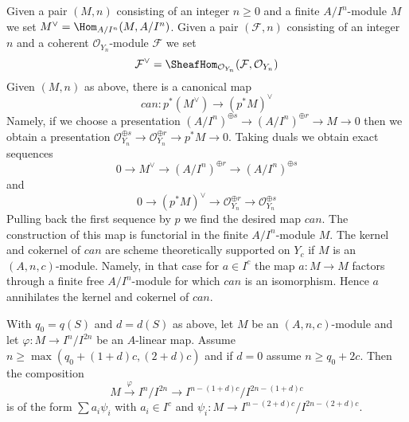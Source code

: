 \begin{remark}
\label{remark-duals}
Given a pair $(M, n)$ consisting of an integer $n \geq 0$
and a finite $A/I^n$-module $M$ we set $M^\vee = \Hom_{A/I^n}(M, A/I^n)$.
Given a pair $(\mathcal{F}, n)$ consisting of an integer $n$ and
a coherent $\mathcal{O}_{Y_n}$-module $\mathcal{F}$ we set
$$
\mathcal{F}^\vee =
\SheafHom_{\mathcal{O}_{Y_n}}(\mathcal{F}, \mathcal{O}_{Y_n})
$$
Given $(M, n)$ as above, there is a canonical map
$$
can : p^*(M^\vee) \longrightarrow (p^*M)^\vee
$$
Namely, if we choose a presentation
$(A/I^n)^{\oplus s} \to (A/I^n)^{\oplus r} \to M \to 0$
then we obtain a presentation
$\mathcal{O}_{Y_n}^{\oplus s} \to \mathcal{O}_{Y_n}^{\oplus r} \to
p^*M \to 0$. Taking duals we obtain exact sequences
$$
0 \to M^\vee \to (A/I^n)^{\oplus r} \to (A/I^n)^{\oplus s}
$$
and
$$
0 \to (p^*M)^\vee \to
\mathcal{O}_{Y_n}^{\oplus r} \to
\mathcal{O}_{Y_n}^{\oplus s}
$$
Pulling back the first sequence by $p$ we find the desired map $can$.
The construction of this map is functorial in the finite
$A/I^n$-module $M$. The kernel and cokernel of $can$
are scheme theoretically supported
on $Y_c$ if $M$ is an $(A, n, c)$-module. Namely, in that case for
$a \in I^c$ the map $a : M \to M$ factors through a finite free
$A/I^n$-module for which $can$ is an isomorphism. Hence $a$ annihilates
the kernel and cokernel of $can$.
\end{remark}

\begin{lemma}
\label{lemma-factor-hom}
With $q_0 = q(S)$ and $d = d(S)$ as above, let $M$ be an $(A, n, c)$-module
and let $\varphi : M \to I^n/I^{2n}$ be an $A$-linear map. Assume
$n \geq \max(q_0 + (1 + d)c, (2 + d)c)$ and if $d = 0$ assume
$n \geq q_0 + 2c$. Then the composition
$$
M \xrightarrow{\varphi} I^n/I^{2n} \to
I^{n - (1 + d)c}/I^{2n - (1 + d)c}
$$
is of the form $\sum a_i \psi_i$ with $a_i \in I^c$ and
$\psi_i : M \to I^{n - (2 + d)c}/I^{2n - (2 + d)c}$.
\end{lemma}


